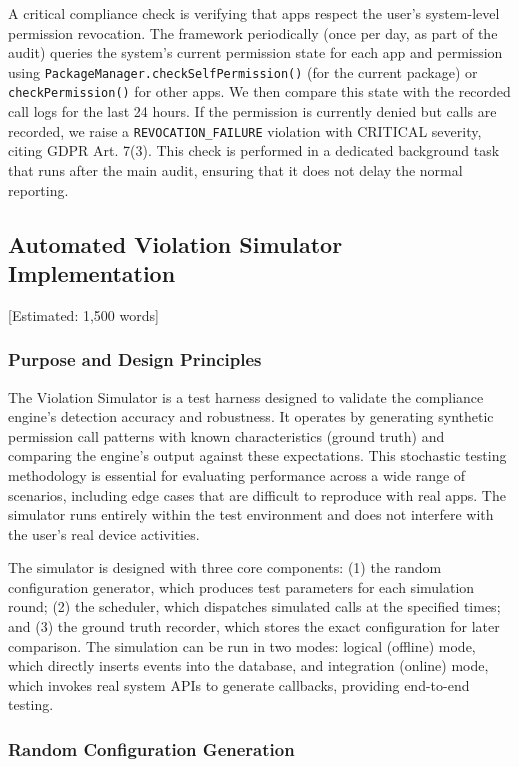 A critical compliance check is verifying that apps respect the user's system-level permission revocation. The framework periodically (once per day, as part of the audit) queries the system's current permission state for each app and permission using \texttt{PackageManager.checkSelfPermission()} (for the current package) or \texttt{checkPermission()} for other apps. We then compare this state with the recorded call logs for the last 24 hours. If the permission is currently denied but calls are recorded, we raise a \texttt{REVOCATION\_FAILURE} violation with CRITICAL severity, citing GDPR Art. 7(3). This check is performed in a dedicated background task that runs after the main audit, ensuring that it does not delay the normal reporting.

\subsection{Automated Violation Simulator Implementation} [Estimated: 1,500 words]

\subsubsection{Purpose and Design Principles}

The Violation Simulator is a test harness designed to validate the compliance engine's detection accuracy and robustness. It operates by generating synthetic permission call patterns with known characteristics (ground truth) and comparing the engine's output against these expectations. This stochastic testing methodology is essential for evaluating performance across a wide range of scenarios, including edge cases that are difficult to reproduce with real apps. The simulator runs entirely within the test environment and does not interfere with the user's real device activities.

The simulator is designed with three core components: (1) the random configuration generator, which produces test parameters for each simulation round; (2) the scheduler, which dispatches simulated calls at the specified times; and (3) the ground truth recorder, which stores the exact configuration for later comparison. The simulation can be run in two modes: logical (offline) mode, which directly inserts events into the database, and integration (online) mode, which invokes real system APIs to generate callbacks, providing end-to-end testing.

\subsubsection{Random Configuration Generation}

